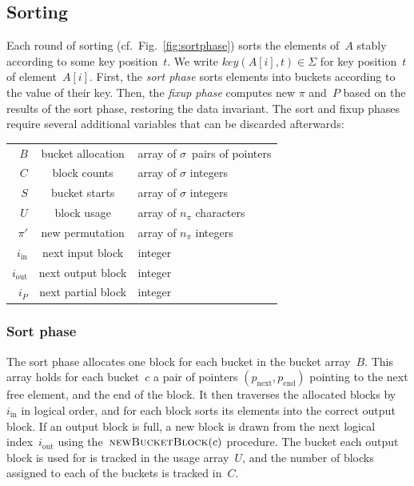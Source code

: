 \documentclass[nolineno,a4paper,UKenglish,cleveref, autoref, thm-restate]{socg-lipics-v2021}
\def\key{\textit{key}}
\begin{document}
\subsection{Sorting}
Each round of sorting (cf.~Fig.~\ref{fig:sortphase}) sorts the elements of~$A$
stably according to some key position~$t$.
We write $\key(A[i],t)\in\Sigma$ for key position~$t$ of element~$A[i]$.
First, the \emph{sort phase} sorts elements into
buckets according to the value of their key.
Then, the \emph{fixup phase} computes new $\pi$ and~$P$ based on the results of the sort phase,
restoring the data invariant.
The sort and fixup phases require several additional variables that can be discarded afterwards:

\vspace{\abovedisplayskip}
\begin{centering}
\begin{tabular}{rcl}
\toprule
$B$&bucket allocation&array of $\sigma$~pairs of pointers\\
$C$&block counts&array of $\sigma$ integers\\
$S$&bucket starts&array of $\sigma$ integers\\
$U$&block usage&array of $n_\pi$ characters\\
$\pi'$&new permutation&array of $n_\pi$ integers\\
$i_{\mathrm{in}}$&next input block&integer\\
$i_{\mathrm{out}}$&next output block&integer\\
$i_P$&next partial block&integer\\
\bottomrule
\end{tabular}
\end{centering}

\subsubsection{Sort phase}
The sort phase allocates one block for each bucket in the bucket array~$B$.  This array
holds for each bucket~$c$ a pair of pointers $(p_{\mathrm{next}},p_{\mathrm{end}})$
pointing to the next free element, and the end of the block.
It then traverses the allocated blocks by~$i_{\mathrm{in}}$ in logical order, and for
each block sorts its elements into the correct output block.  If an output block is full,
a new block is drawn from the next logical index~$i_{\mathrm{out}}$ using
the~$\Call{newBucketBlock}{c}$ procedure.
The bucket each output block is
used for is tracked in the usage array~$U$, and the number of blocks assigned to each
of the buckets is tracked in~$C$.
\end{document}
